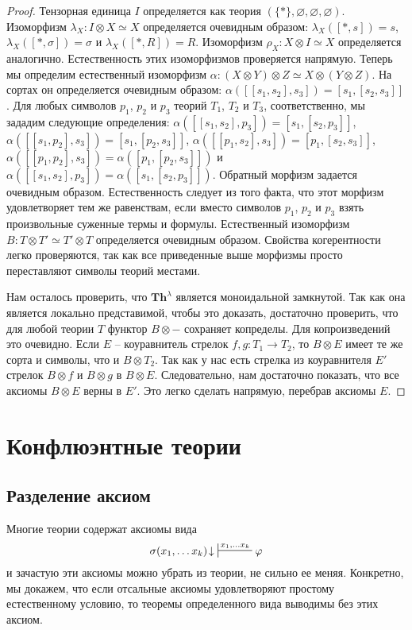 \documentclass[reqno]{amsart}
\theoremstyle{definition}
\theoremstyle{remark}
\newcommand{\bcat}[1]{\mathbf{#1}}
\newcommand{\Th}{\bcat{Th}}
\begin{document}
\begin{proof}
Тензорная единица $I$ определяется как теория $(\{*\},\varnothing,\varnothing,\varnothing)$.
Изоморфизм $\lambda_X : I \otimes X \simeq X$ определяется очевидным образом: $\lambda_X([*,s]) = s$, $\lambda_X([*,\sigma]) = \sigma$ и $\lambda_X([*,R]) = R$.
Изоморфизм $\rho_X : X \otimes I \simeq X$ определяется аналогично.
Естественность этих изоморфизмов проверяется напрямую.
Теперь мы определим естественный изоморфизм $\alpha : (X \otimes Y) \otimes Z \simeq X \otimes (Y \otimes Z)$.
На сортах он определяется очевидным образом: $\alpha([[s_1,s_2],s_3]) = [s_1,[s_2,s_3]]$.
Для любых символов $p_1$, $p_2$ и $p_3$ теорий $T_1$, $T_2$ и $T_3$, соответственно, мы зададим следующие определения:
$\alpha([[s_1,s_2],p_3]) = [s_1,[s_2,p_3]]$, $\alpha([[s_1,p_2],s_3]) = [s_1,[p_2,s_3]]$, $\alpha([[p_1,s_2],s_3]) = [p_1,[s_2,s_3]]$, $\alpha([[p_1,p_2],s_3]) = \alpha([p_1,[p_2,s_3]])$ и $\alpha([[s_1,s_2],p_3]) = \alpha([s_1,[s_2,p_3]])$.
Обратный морфизм задается очевидным образом.
Естественность следует из того факта, что этот морфизм удовлетворяет тем же равенствам, если вместо символов $p_1$, $p_2$ и $p_3$ взять произвольные суженные термы и формулы.
Естественный изоморфизм $B : T \otimes T' \simeq T' \otimes T$ определяется очевидным образом.
Свойства когерентности легко проверяются, так как все приведенные выше морфизмы просто переставляют символы теорий местами.

Нам осталось проверить, что $\Th^\lambda$ является моноидальной замкнутой.
Так как она является локально представимой, чтобы это доказать, достаточно проверить, что для любой теории $T$ функтор $B \otimes -$ сохраняет копределы.
Для копроизведений это очевидно.
Если $E$ -- коуравнитель стрелок $f,g : T_1 \to T_2$, то $B \otimes E$ имеет те же сорта и символы, что и $B \otimes T_2$.
Так как у нас есть стрелка из коуравнителя $E'$ стрелок $B \otimes f$ и $B \otimes g$ в $B \otimes E$.
Следовательно, нам достаточно показать, что все аксиомы $B \otimes E$ верны в $E'$.
Это легко сделать напрямую, перебрав аксиомы $E$.
\end{proof}

\section{Конфлюэнтные теории}

\subsection{Разделение аксиом}

Многие теории содержат аксиомы вида
\[ \sigma(x_1, \ldots x_k)\!\downarrow\ \sststile{}{x_1, \ldots x_k} \varphi \]
и зачастую эти аксиомы можно убрать из теории, не сильно ее меняя.
Конкретно, мы докажем, что если отсальные аксиомы удовлетворяют простому естественному условию, то теоремы определенного вида выводимы без этих аксиом.
\end{document}
